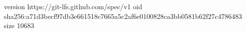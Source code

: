 version https://git-lfs.github.com/spec/v1
oid sha256:a71d3becf97db3e661518c7665a5c2af6e0100828ca3bb0581b62f27c4786483
size 10683
